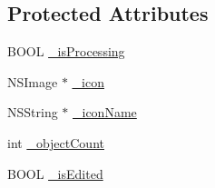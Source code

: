 \subsection*{Protected Attributes}
\begin{DoxyCompactItemize}
\item 
B\-O\-O\-L \hyperlink{interface_fake_model_adda5edc20f1f734ae2662f3e9751e4a0}{\-\_\-is\-Processing}
\item 
N\-S\-Image $\ast$ \hyperlink{interface_fake_model_aaa19a1a5b11d5d3853ca578fa8023541}{\-\_\-icon}
\item 
N\-S\-String $\ast$ \hyperlink{interface_fake_model_ad9b2092eff58132fa1cbdbcfc4fe3a60}{\-\_\-icon\-Name}
\item 
int \hyperlink{interface_fake_model_a2f50552d1998209d3c5967fcc93bb59e}{\-\_\-object\-Count}
\item 
B\-O\-O\-L \hyperlink{interface_fake_model_a9c8a3ac3fc0b679af17c85cf3a1c3b76}{\-\_\-is\-Edited}
\end{DoxyCompactItemize}


